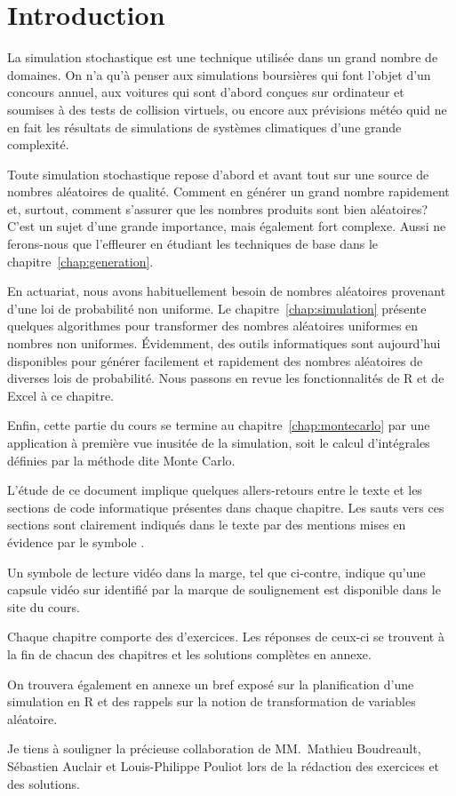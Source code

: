 \chapter*{Introduction}

La simulation stochastique est une technique utilisée dans un grand
nombre de domaines. On n'a qu'à penser aux simulations boursières qui
font l'objet d'un concours annuel, aux voitures qui sont d'abord
conçues sur ordinateur et soumises à des tests de collision virtuels,
ou encore aux prévisions météo quid ne en fait les résultats de
simulations de systèmes climatiques d'une grande complexité.

Toute simulation stochastique repose d'abord et avant tout sur une
source de nombres aléatoires de qualité. Comment en générer un grand
nombre rapidement et, surtout, comment s'assurer que les nombres
produits sont bien aléatoires? C'est un sujet d'une grande importance,
mais également fort complexe. Aussi ne ferons-nous que l'effleurer en
étudiant les techniques de base dans le
chapitre~\ref{chap:generation}.

En actuariat, nous avons habituellement besoin de nombres aléatoires
provenant d'une loi de probabilité non uniforme. Le
chapitre~\ref{chap:simulation} présente quelques algorithmes pour
transformer des nombres aléatoires uniformes en nombres non uniformes.
Évidemment, des outils informatiques sont aujourd'hui disponibles pour
générer facilement et rapidement des nombres aléatoires de diverses
lois de probabilité. Nous passons en revue les fonctionnalités de R et
de Excel à ce chapitre.

Enfin, cette partie du cours se termine au
chapitre~\ref{chap:montecarlo} par une application à première vue
inusitée de la simulation, soit le calcul d'intégrales définies par la
méthode dite Monte Carlo.

L'étude de ce document implique quelques allers-retours entre le texte
et les sections de code informatique présentes dans chaque chapitre.
Les sauts vers ces sections sont clairement indiqués dans le texte par
des mentions mises en évidence par le symbole {\ForwardToEnd}.

Un symbole de lecture vidéo dans la marge, tel que ci-contre, indique
qu'une capsule vidéo sur  identifié par la marque de
soulignement est disponible dans le site du cours.

Chaque chapitre comporte des d'exercices. Les réponses de ceux-ci se
trouvent à la fin de chacun des chapitres et les solutions complètes
en annexe.

On trouvera également en annexe un bref exposé sur la planification
d'une simulation en R et des rappels sur la notion de transformation
de variables aléatoire.

Je tiens à souligner la précieuse collaboration de MM.~Mathieu
Boudreault, Sébastien Auclair et Louis-Philippe Pouliot lors de la
rédaction des exercices et des solutions.

